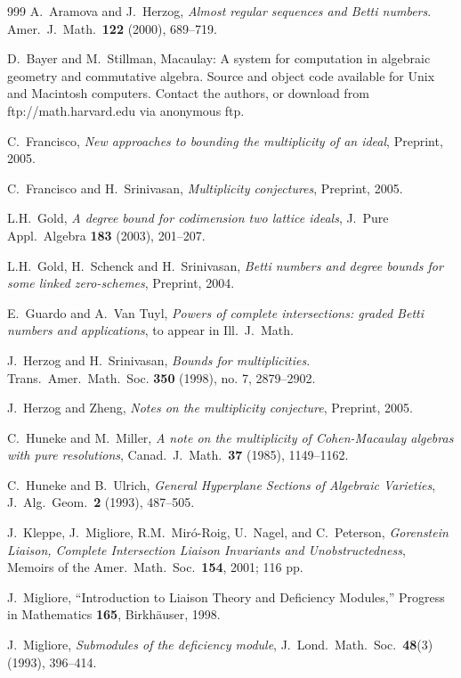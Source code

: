 \documentclass[12pt,twoside]{amsart}
\numberwithin{equation}{section}
\theoremstyle{definition}
\begin{document}
\begin{thebibliography}{999}
A.\ Aramova and J.\ Herzog, {\it Almost regular sequences and Betti numbers}. Amer.\ J.\
Math.\ {\bf 122} (2000), 689--719.

 D.\ Bayer and M.\ Stillman, Macaulay: A system for
computation in algebraic geometry and commutative algebra. Source and object code
available for Unix and Macintosh computers.  Contact the authors, or download from
ftp://math.harvard.edu via anonymous ftp.

C.\ Francisco, {\em New approaches to bounding the multiplicity of an ideal}, Preprint,
2005.

 C.\ Francisco and H.\ Srinivasan, {\em Multiplicity conjectures}, Preprint, 2005.

 L.H.\ Gold, {\em A degree bound for codimension two lattice
ideals}, J.\ Pure Appl.\ Algebra {\bf 183} (2003), 201--207.

 L.H.\ Gold, H.\ Schenck and H.\ Srinivasan, {\em Betti
numbers and degree bounds for some linked zero-schemes}, Preprint, 2004.

 E.\ Guardo and A.\ Van Tuyl, {\em Powers of complete
intersections: graded Betti numbers and applications}, to appear in Ill.\ J.\ Math.

J.\ Herzog and H.\ Srinivasan, {\em Bounds for multiplicities}. Trans.\ Amer.\ Math.\
Soc. {\bf 350} (1998), no. 7, 2879--2902.

J.\ Herzog  and Zheng, {\em Notes on the multiplicity conjecture}, Preprint, 2005.

\bibitem{HM} C.\ Huneke and M.\ Miller, {\em A note on the multiplicity of
Cohen-Macaulay algebras with pure resolutions}, Canad.\ J.\ Math.\ {\bf 37} (1985),
1149--1162.

 C.\ Huneke and B.\ Ulrich, {\em General Hyperplane Sections of
Algebraic Varieties}, J.\ Alg.\ Geom.\ {\bf 2} (1993), 487--505.

\bibitem{KMMNP} J.\ Kleppe, J.\ Migliore, R.M.\ Mir\'o-Roig, U.\ Nagel, and C.\
Peterson, {\em Gorenstein Liaison, Complete Intersection Liaison Invariants and
Unobstructedness}, Memoirs of the Amer.\ Math.\ Soc.\ {\bf 154}, 2001; 116 pp.

\bibitem{migbook} J.\ Migliore, ``Introduction to Liaison Theory and
Deficiency Modules,''   Progress in Mathematics {\bf 165}, Birkh\"auser, 1998.

\bibitem{london} J.\ Migliore, {\em Submodules of the deficiency module}, J.\
Lond.\ Math.\  Soc.\ {\bf  48}(3) (1993), 396--414.


\end{thebibliography}
\end{document}
